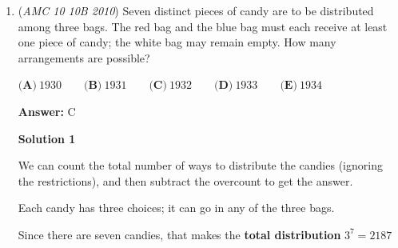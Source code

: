 \begin{enumerate}
 \textbf{Addendum (Alternate)} $7\mid 1001a^3+110b^2$ and $1001 \equiv 0 \pmod 7$. Knowing that $a$ does not factor (pun intended) into the problem, note 110's prime factorization and $7\mid b$. There are only 10 possible digits for $b$, 0 through 9, but $7\mid b$ only holds if $b=0, 7$. This is 2 of the 10 digits, so $\frac{2}{10}=\boxed{\textbf{(E) }\frac{1}{5}}$




\textbf{Solution 4}

The palindrome is in the form of $\overline{abba}$. There are $9$ possible values of $a$ and 10 possible values for $b$. Thus, there are $90$ four-digit palindromes. The smallest palindrome is $1001$, which is a multiple of $7$. Note how each palindrome with the same thousands and ones digit increase by $110$ (i.e., $1111-1001=110$, $1221-1111=110$, etc). $110 \equiv 5$ (mod $7$). Since $5$ and $7$ is coprime, to get another palindrome that is a multiple of $7$, we need to increase by $770$. $1001+770=1771$. Next, when the thousands place is $2$, we start with $2002$, which is a multiple of $1001$, so $2002 \equiv 0$ (mod $7$). Therefore, $2772$ is also a satisfactory palindrome. Similarly, for every thousands place, there are $2$ satisfactory palindromes, which means there are a total of $2 \cdot 9 = 18$ satisfactory palindromes. Thus, the answer is $\frac{18}{90} = \frac{1}{5}$ or $\boxed{\text{(E)}\ \frac{1}{5}}$.

 


	\item (\textit{AMC 10 10B 2010}) Seven distinct pieces of candy are to be distributed among three bags. The red bag and the blue bag must each receive at least one piece of candy; the white bag may remain empty. How many arrangements are possible?


 $\textbf{(A)}\ 1930 \qquad \textbf{(B)}\ 1931 \qquad \textbf{(C)}\ 1932 \qquad \textbf{(D)}\ 1933 \qquad \textbf{(E)}\ 1934$

 \textbf{Answer: }C



\textbf{Solution 1}

We can count the total number of ways to distribute the candies (ignoring the restrictions), and then subtract the overcount to get the answer.

 Each candy has three choices; it can go in any of the three bags.

 Since there are seven candies, that makes the \textbf{total distribution} $3^7=2187$


\end{enumerate}
